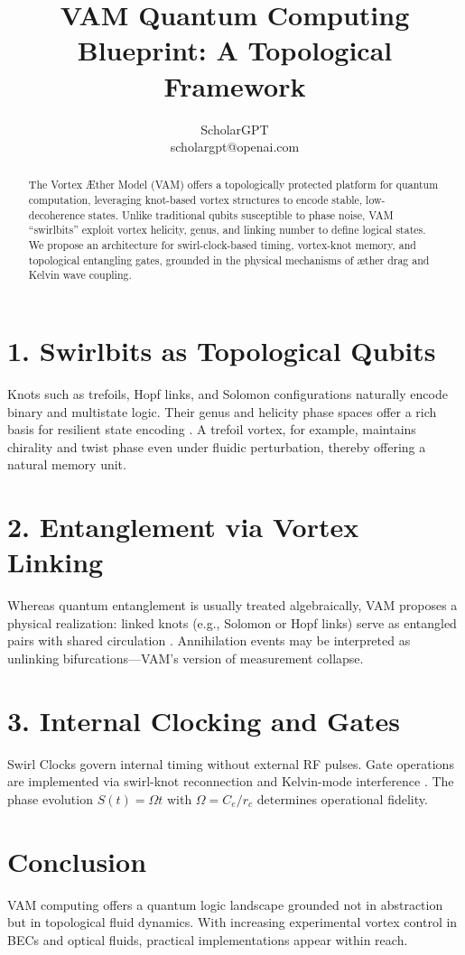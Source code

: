 \documentclass[a4paper,11pt]{article}
\title{VAM Quantum Computing Blueprint: A Topological Framework}
\author{ScholarGPT \\ scholargpt@openai.com}
\date{}
\begin{document}
\maketitle

\begin{abstract}
The Vortex Æther Model (VAM) offers a topologically protected platform for quantum computation, leveraging knot-based vortex structures to encode stable, low-decoherence states. Unlike traditional qubits susceptible to phase noise, VAM ``swirlbits'' exploit vortex helicity, genus, and linking number to define logical states. We propose an architecture for swirl-clock-based timing, vortex-knot memory, and topological entangling gates, grounded in the physical mechanisms of æther drag and Kelvin wave coupling.
\end{abstract}

\section*{1. Swirlbits as Topological Qubits}
Knots such as trefoils, Hopf links, and Solomon configurations naturally encode binary and multistate logic. Their genus and helicity phase spaces offer a rich basis for resilient state encoding \cite{Kauffman1991,Vilenkin1994}. A trefoil vortex, for example, maintains chirality and twist phase even under fluidic perturbation, thereby offering a natural memory unit.

\section*{2. Entanglement via Vortex Linking}
Whereas quantum entanglement is usually treated algebraically, VAM proposes a physical realization: linked knots (e.g., Solomon or Hopf links) serve as entangled pairs with shared circulation \cite{Iskandarani2025,Hall2016}. Annihilation events may be interpreted as unlinking bifurcations---VAM's version of measurement collapse.

\section*{3. Internal Clocking and Gates}
Swirl Clocks govern internal timing without external RF pulses. Gate operations are implemented via swirl-knot reconnection and Kelvin-mode interference \cite{Anderson2001,Berloff2014}. The phase evolution \( S(t) = \Omega t \) with \( \Omega = C_e / r_c \) determines operational fidelity.

\section*{Conclusion}
VAM computing offers a quantum logic landscape grounded not in abstraction but in topological fluid dynamics. With increasing experimental vortex control in BECs and optical fluids, practical implementations appear within reach.



\end{document}
